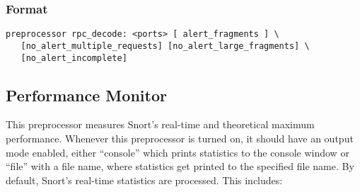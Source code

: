 \documentclass[english]{report}
\begin{document}
\subsubsection{Format}

\begin{verbatim}
preprocessor rpc_decode: <ports> [ alert_fragments ] \
   [no_alert_multiple_requests] [no_alert_large_fragments] \
   [no_alert_incomplete]
\end{verbatim}

\subsection{Performance Monitor\label{sub:perfmonitor}}

This preprocessor measures Snort's real-time and theoretical maximum
performance.  Whenever this preprocessor is turned on, it should have an output
mode enabled, either ``console'' which prints statistics to the console window or
``file'' with a file name, where statistics get printed to the specified file
name. By default, Snort's real-time statistics are processed. This includes:
\end{document}
